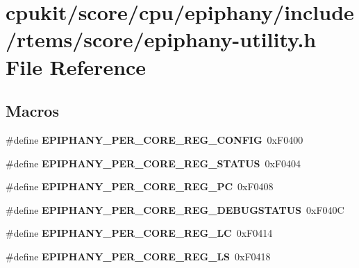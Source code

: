 \hypertarget{epiphany-utility_8h}{}\section{cpukit/score/cpu/epiphany/include/rtems/score/epiphany-\/utility.h File Reference}
\label{epiphany-utility_8h}
\subsection*{Macros}
\begin{DoxyCompactItemize}
\item 
\mbox{\label{epiphany-utility_8h_abf74b04eaf001d2aa6b6656e747a0d66}} 
\#define {\bfseries E\+P\+I\+P\+H\+A\+N\+Y\+\_\+\+P\+E\+R\+\_\+\+C\+O\+R\+E\+\_\+\+R\+E\+G\+\_\+\+C\+O\+N\+F\+IG}~0x\+F0400
\item 
\mbox{\label{epiphany-utility_8h_ada99a1cf67feccc3b8780957cf945e86}} 
\#define {\bfseries E\+P\+I\+P\+H\+A\+N\+Y\+\_\+\+P\+E\+R\+\_\+\+C\+O\+R\+E\+\_\+\+R\+E\+G\+\_\+\+S\+T\+A\+T\+US}~0x\+F0404
\item 
\mbox{\label{epiphany-utility_8h_abb14c241f0ee496f2522351374ac0686}} 
\#define {\bfseries E\+P\+I\+P\+H\+A\+N\+Y\+\_\+\+P\+E\+R\+\_\+\+C\+O\+R\+E\+\_\+\+R\+E\+G\+\_\+\+PC}~0x\+F0408
\item 
\mbox{\label{epiphany-utility_8h_a7c3acb8f2167da73c4971fd905f003a2}} 
\#define {\bfseries E\+P\+I\+P\+H\+A\+N\+Y\+\_\+\+P\+E\+R\+\_\+\+C\+O\+R\+E\+\_\+\+R\+E\+G\+\_\+\+D\+E\+B\+U\+G\+S\+T\+A\+T\+US}~0x\+F040C
\item 
\mbox{\label{epiphany-utility_8h_a6fe56abe6603ee151ac8b8a3c8bbffa2}} 
\#define {\bfseries E\+P\+I\+P\+H\+A\+N\+Y\+\_\+\+P\+E\+R\+\_\+\+C\+O\+R\+E\+\_\+\+R\+E\+G\+\_\+\+LC}~0x\+F0414
\item 
\mbox{\label{epiphany-utility_8h_a8acfb887e4585aa97ca5cb9bebd13251}} 
\#define {\bfseries E\+P\+I\+P\+H\+A\+N\+Y\+\_\+\+P\+E\+R\+\_\+\+C\+O\+R\+E\+\_\+\+R\+E\+G\+\_\+\+LS}~0x\+F0418
\item 
\mbox{\label{epiphany-utility_8h_adc4ddc2ff0d6b8cab438f67b7809b3a2}} 

\end{DoxyCompactItemize}
